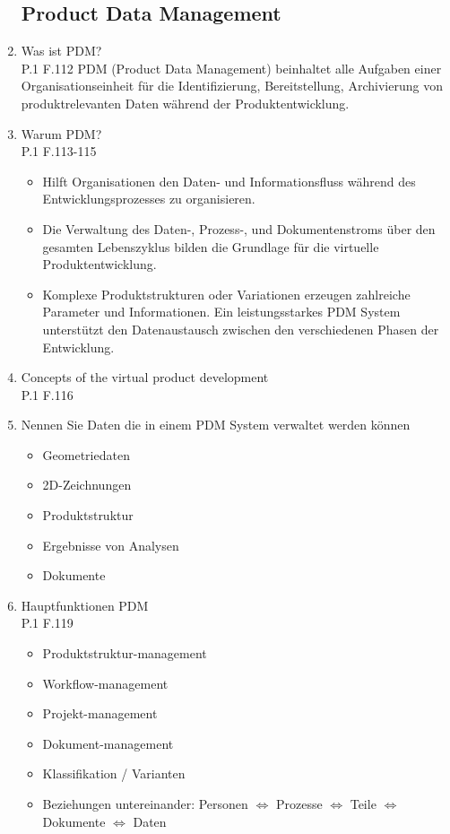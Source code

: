 \documentclass[10pt,a4paper,fleqn]{article}
\begin{document}
\begin{enumerate}
\subsection{Product Data Management}
	\item Was ist PDM?\\
		P.1 F.112
		PDM (Product Data Management) beinhaltet alle Aufgaben einer Organisationseinheit für die Identifizierung, Bereitstellung, Archivierung von produktrelevanten Daten während der Produktentwicklung.
	\item Warum PDM?\\
		P.1 F.113-115
		\begin{itemize}
			\item Hilft Organisationen den Daten- und Informationsfluss während des Entwicklungsprozesses zu organisieren.
			\item Die Verwaltung des Daten-, Prozess-, und Dokumentenstroms über den gesamten Lebenszyklus bilden die Grundlage für die virtuelle Produktentwicklung.
			\item Komplexe Produktstrukturen oder Variationen erzeugen zahlreiche Parameter und Informationen. Ein leistungsstarkes PDM System unterstützt den Datenaustausch zwischen den verschiedenen Phasen der Entwicklung.
		\end{itemize}
	\item Concepts of the virtual product development\\
		P.1 F.116
	\item Nennen Sie Daten die in einem PDM System verwaltet werden können
		\begin{itemize}
			\item Geometriedaten
			\item 2D-Zeichnungen
			\item Produktstruktur
			\item Ergebnisse von Analysen
			\item Dokumente
		\end{itemize}
	\item Hauptfunktionen PDM\\
		P.1 F.119
		\begin{itemize}
			\item Produktstruktur-management
			\item Workflow-management
			\item Projekt-management
			\item Dokument-management
			\item Klassifikation / Varianten
			\item Beziehungen untereinander: Personen $\Leftrightarrow$ Prozesse $\Leftrightarrow$ Teile $\Leftrightarrow$ Dokumente $\Leftrightarrow$ Daten
		\end{itemize}
\newpage

\end{enumerate}
\end{document}
